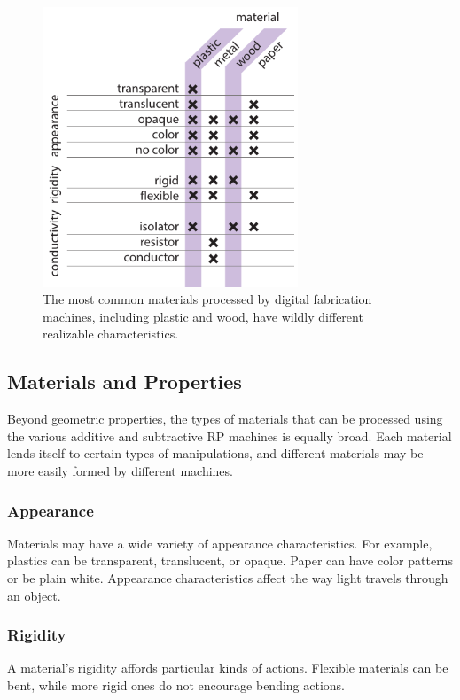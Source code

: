 \begin{figure}
\centering
\includegraphics[width=3in]{figures/fab-properties.pdf}
\caption{The most common materials processed by digital fabrication machines, including plastic and wood, have wildly different realizable characteristics.}
\label{table:fab-properties}
\end{figure}

\subsection{Materials and Properties}

Beyond geometric properties, the types of materials that can be processed using the various additive and subtractive RP machines is equally broad. Each material lends itself to certain types of manipulations, and different materials may be more easily formed by different machines.

\subsubsection{Appearance}

Materials may have a wide variety of appearance characteristics. For example, plastics can be transparent, translucent, or opaque. Paper can have color patterns or be plain white. Appearance characteristics affect the way light travels through an object. 

\subsubsection{Rigidity}

A material's rigidity affords particular kinds of actions. Flexible materials can be bent, while more rigid ones do not encourage bending actions.

